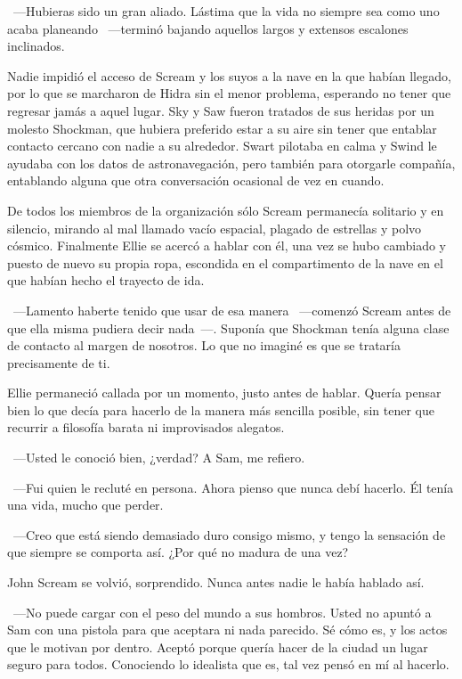 ~---Hubieras sido un gran aliado. Lástima que la vida no siempre sea como uno acaba planeando ~---terminó bajando aquellos largos y extensos escalones inclinados.

\parbreak
Nadie impidió el acceso de Scream y los suyos a la nave en la que habían llegado, por lo que se marcharon de Hidra sin el menor problema, esperando no tener que regresar jamás a aquel lugar. Sky y Saw fueron tratados de sus heridas por un molesto Shockman, que hubiera preferido estar a su aire sin tener que entablar contacto cercano con nadie a su alrededor. Swart pilotaba en calma y Swind le ayudaba con los datos de astronavegación, pero también para otorgarle compañía, entablando alguna que otra conversación ocasional de vez en cuando.

De todos los miembros de la organización sólo Scream permanecía solitario y en silencio, mirando al mal llamado vacío espacial, plagado de estrellas y polvo cósmico. Finalmente Ellie se acercó a hablar con él, una vez se hubo cambiado y puesto de nuevo su propia ropa, escondida en el compartimento de la nave en el que habían hecho el trayecto de ida.

~---Lamento haberte tenido que usar de esa manera ~---comenzó Scream antes de que ella misma pudiera decir nada~---. Suponía que Shockman tenía alguna clase de contacto al margen de nosotros. Lo que no imaginé es que se trataría precisamente de ti.

Ellie permaneció callada por un momento, justo antes de hablar. Quería pensar bien lo que decía para hacerlo de la manera más sencilla posible, sin tener que recurrir a filosofía barata ni improvisados alegatos.

~---Usted le conoció bien, ¿verdad? A Sam, me refiero.

~---Fui quien le recluté en persona. Ahora pienso que nunca debí hacerlo. Él tenía una vida, mucho que perder.

~---Creo que está siendo demasiado duro consigo mismo, y tengo la sensación de que siempre se comporta así. ¿Por qué no madura de una vez?

John Scream se volvió, sorprendido. Nunca antes nadie le había hablado así.

~---No puede cargar con el peso del mundo a sus hombros. Usted no apuntó a Sam con una pistola para que aceptara ni nada parecido. Sé cómo es, y los actos que le motivan por dentro. Aceptó porque quería hacer de la ciudad un lugar seguro para todos. Conociendo lo idealista que es, tal vez pensó en mí al hacerlo.

